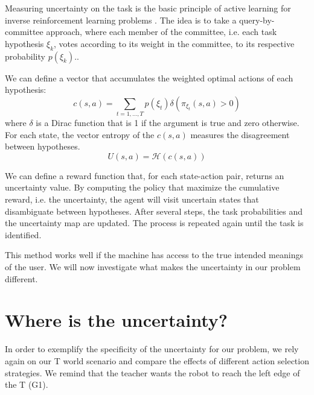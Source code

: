 
Measuring uncertainty on the task is the basic principle of active learning for inverse reinforcement learning problems \cite{macl09airl}. The idea is to take a query-by-committee approach, where each member of the committee, i.e. each task hypothesis $\xi_k$, votes according to its weight in the committee, to its respective probability $p(\xi_k)$.. 

We can define a vector that accumulates the weighted optimal actions of each hypothesis: 
%
\[
c(s,a) = \sum_{t = 1, \ldots, T} p(\xi_t) \delta(\pi_{\xi_t}(s,a) > 0)
\]
%
where $\delta$ is a Dirac function that is 1 if the argument is true and zero otherwise. For each state, the vector entropy of the $c(s,a)$ measures the disagreement between hypotheses.
%
\[
U(s,a) = \mathcal{H}(c(s,a))
\]
%

We can define a reward function that, for each state-action pair, returns an uncertainty value. By computing the policy that maximize the cumulative reward, i.e. the uncertainty, the agent will visit uncertain states that disambiguate between hypotheses. After several steps, the task probabilities and the uncertainty map are updated. The process is repeated again until the task is identified.

This method works well if the machine has access to the true intended meanings of the user. We will now investigate what makes the uncertainty in our problem different.

\section{Where is the uncertainty?}
\label{chapter:planning:where}

In order to exemplify the specificity of the  uncertainty for our problem, we rely again on our T world scenario and compare the effects of different action selection strategies. We remind that the teacher wants the robot to reach the left edge of the T (G1).

